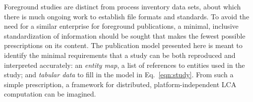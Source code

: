 Foreground studies are distinct from process inventory data sets, about which there is much ongoing work to establish file formats and standards.  To avoid the need for a similar enterprise for foreground publications, a minimal, inclusive standardization of information should be sought that makes the fewest possible prescriptions on its content.  The publication model presented here is meant to identify the minimal requirements that a study can be both reproduced and interpreted accurately: an \emph{entity map}, a list of references to entities used in the study; and \emph{tabular data} to fill in the model in Eq.~\ref{eqn:study}.  From such a simple prescription, a framework for distributed, platform-independent LCA computation can be imagined.
